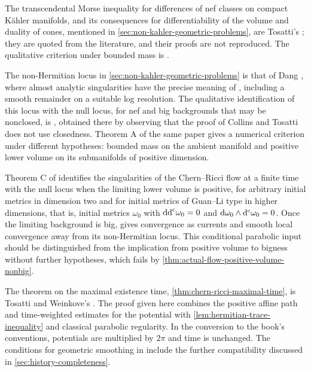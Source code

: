 The transcendental Morse inequality for differences of nef classes on compact K\"ahler manifolds, and its consequences for differentiability of the volume and duality of cones, mentioned in \cref{sec:non-kahler-geometric-problems}, are Tosatti's \cite[v2, Theorem~1.1 and Corollary~1.2]{Tosatti26}; they are quoted from the literature, and their proofs are not reproduced. The qualitative criterion under bounded mass is \cite[Theorem 4.12]{GL22}.

The non-Hermitian locus in \cref{sec:non-kahler-geometric-problems} is that of Dang \cite[Definition 2.12 and Theorem 2.14]{DangNull26}, where almost analytic singularities have the precise meaning of \cite[Definition 2.8]{DangNull26}, including a smooth remainder on a suitable log resolution. The qualitative identification of this locus with the null locus, for nef and big backgrounds that may be nonclosed, is \cite[Theorem 1.1]{DangNull26}, obtained there by observing that the proof of Collins and Tosatti does not use closedness. Theorem A of the same paper gives a numerical criterion under different hypotheses: bounded mass on the ambient manifold and positive lower volume on its submanifolds of positive dimension.

Theorem C of \cite{DangNull26} identifies the singularities of the Chern--Ricci flow at a finite time with the null locus when the limiting lower volume is positive, for arbitrary initial metrics in dimension two and for initial metrics of Guan--Li type in higher dimensions, that is, initial metrics $\omega_0$ with $\mathrm{dd}^{\mathrm{c}}\omega_0=0$ and $\mathrm{d}\omega_0\wedge\mathrm d^{\mathrm c}\omega_0=0$. Once the limiting background is big, \cite[Theorem 4.3]{DangNull26} gives convergence as currents and smooth local convergence away from its non-Hermitian locus. This conditional parabolic input should be distinguished from the implication from positive volume to bigness without further hypotheses, which fails by \cref{thm:actual-flow-positive-volume-nonbig}.

The theorem on the maximal existence time, \cref{thm:chern-ricci-maximal-time}, is Tosatti and Weinkove's \cite[Theorem~1.2 and~(1.4), pp.~126--127, and Section~4, pp.~138--142]{TW15}. The proof given here combines the positive affine path and time-weighted estimates for the potential with \cref{lem:hermitian-trace-inequality} and classical parabolic regularity. In the conversion to the book's conventions, potentials are multiplied by $2\pi$ and time is unchanged. The conditions for geometric smoothing in \cite[v1, Section~3.1, pp.~12--14]{DNGL26} include the further compatibility discussed in \cref{sec:history-completeness}.

